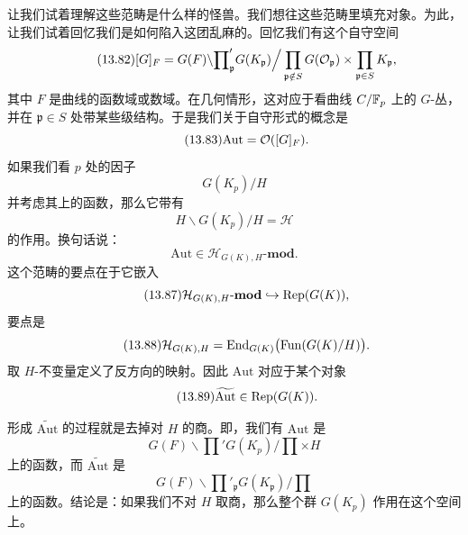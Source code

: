 让我们试着理解这些范畴是什么样的怪兽。我们想往这些范畴里填充对象。为此，让我们试着回忆我们是如何陷入这团乱麻的。回忆我们有这个自守空间
\begin{equation}\tag{13.82}
[G]_F=G(F)\backslash{\prod}'_{\mathfrak p}G(K_{\mathfrak p})\Big/\prod_{\mathfrak p\notin S}G(\mathcal{O}_{\mathfrak p})\times\prod_{\mathfrak p\in S}K_{\mathfrak p},
\end{equation}
其中 $F$ 是曲线的函数域或数域。在几何情形，这对应于看曲线 $C/\mathbb{F}_p$ 上的 $G$-丛，并在 $\mathfrak p\in S$ 处带某些级结构。于是我们关于自守形式的概念是
\begin{equation}\tag{13.83}
\mathrm{Aut}=\mathcal{O}([G]_F).
\end{equation}
如果我们看 $p$ 处的因子
\begin{equation}\tag{13.84}
G(K_p)/H
\end{equation}
并考虑其上的函数，那么它带有
\begin{equation}\tag{13.85}
H\backslash G(K_p)/H=\mathcal{H}
\end{equation}
的作用。换句话说：
\begin{equation}\tag{13.86}
\mathrm{Aut}\in \mathcal{H}_{G(K),H}\text{-}\mathbf{mod}.
\end{equation}
这个范畴的要点在于它嵌入
\begin{equation}\tag{13.87}
\mathcal{H}_{G(K),H}\text{-}\mathbf{mod}\hookrightarrow \mathrm{Rep}(G(K)),
\end{equation}
要点是
\begin{equation}\tag{13.88}
\mathcal{H}_{G(K),H}=\mathrm{End}_{G(K)}\bigl(\mathrm{Fun}(G(K)/H)\bigr).
\end{equation}
取 $H$-不变量定义了反方向的映射。因此 $\mathrm{Aut}$ 对应于某个对象
\begin{equation}\tag{13.89}
\widetilde{\mathrm{Aut}}\in\mathrm{Rep}(G(K)).
\end{equation}

形成 $\widetilde{\mathrm{Aut}}$ 的过程就是去掉对 $H$ 的商。即，我们有 $\mathrm{Aut}$ 是
\begin{equation}\tag{13.90}
G(F)\backslash{\prod}'G(K_p)\Big/\prod\times H
\end{equation}
上的函数，而 $\widetilde{\mathrm{Aut}}$ 是
\begin{equation}\tag{13.91}
G(F)\backslash{\prod}'_{\mathfrak p}G(K_{\mathfrak p})\Big/\prod
\end{equation}
上的函数。结论是：如果我们不对 $H$ 取商，那么整个群 $G(K_p)$ 作用在这个空间上。

